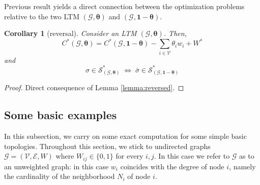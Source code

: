 \documentclass[12pt,twoside,reqno]{amsart}
\newtheorem{corollary}[theorem]{Corollary}
\theoremstyle{definition}
\numberwithin{equation}{section}
\newcommand{\mc}{\mathcal}
\newcommand{\0}{\mathbf{0}}
\newcommand{\1}{\mathbf{1}}
\newcommand{\threabs}{\theta}
\newcommand{\Thre}{\mathbf{\theta}}
\newcommand{\we}{W^*}
\begin{document}
{Previous result yields a direct connection between the optimization problems relative to the two LTM $(\mc G,\Thre)$ and $(\mc G,\1-\Thre)$.

\begin{corollary}[reversal]
\label{cor:rev} Consider an LTM $(\mc G, \Thre)$. Then,
$$C^*(\mc G,\Thre)=C^*(\mc G,\1-\Thre)-\sum\limits_{i\in\mc V}\threabs_{i}w_i+\we$$
and
 $$\sigma\in \mathcal S_{(\mc G,\Thre)}^*\;\Leftrightarrow\; \bar\sigma\in \mathcal S_{(\mc G,\1-\Thre)}^*$$
\end{corollary}
\begin{proof}
Direct consequence of Lemma \ref{lemma:reversed}.
\end{proof}

}





\subsection{Some basic examples}
In this subsection, we carry on some exact computation for some simple basic topologies. Throughout this section, we stick to undirected graphs $\mc G=(\mc V,\mc E, W)$ where $W_{ij}\in\{0,1\}$ for every $i,j$. In this case we refer to $\mc G$ as to an unweighted graph: in this case $w_i$ coincides with the degree of node $i$, namely the cardinality of the neighborhood $N_i$ of node $i$. 
\end{document}
